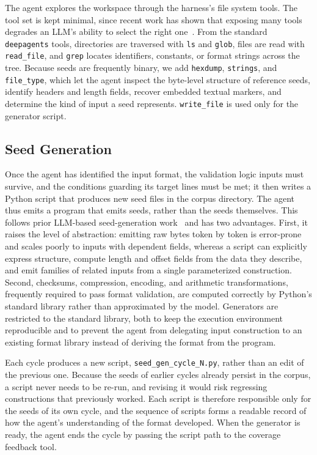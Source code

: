 The agent explores the workspace through the harness's file system tools.
The tool set is kept minimal, since recent work has shown that exposing many tools degrades an \ac{LLM}'s ability to select the right one~\cite{paramanayakamLessMoreOptimizing2025, repantisHowManyTools2026}.
From the standard \texttt{deepagents} tools, directories are traversed with \texttt{ls} and \texttt{glob}, files are read with \texttt{read\_file}, and \texttt{grep} locates identifiers, constants, or format strings across the tree.
Because seeds are frequently binary, we add \texttt{hexdump}, \texttt{strings}, and \texttt{file\_type}, which let the agent inspect the byte-level structure of reference seeds, identify headers and length fields, recover embedded textual markers, and determine the kind of input a seed represents.
\texttt{write\_file} is used only for the generator script.

\subsection{Seed Generation}
\label{sec:agent-generation}

Once the agent has identified the input format, the validation logic inputs must survive, and the conditions guarding its target lines must be met; it then writes a Python script that produces new seed files in the corpus directory.
The agent thus emits a program that emits seeds, rather than the seeds themselves.
This follows prior \ac{LLM}-based seed-generation work~\cite{zhuSeedSmithLLMDrivenSeed2026,xuISC4DGFEnhancingDirected2024,fengFuzzingRandomnessReasoning2025} and has two advantages.
First, it raises the level of abstraction: emitting raw bytes token by token is error-prone and scales poorly to inputs with dependent fields, whereas a script can explicitly express structure, compute length and offset fields from the data they describe, and emit families of related inputs from a single parameterized construction.
Second, checksums, compression, encoding, and arithmetic transformations, frequently required to pass format validation, are computed correctly by Python's standard library rather than approximated by the model.
Generators are restricted to the standard library, both to keep the execution environment reproducible and to prevent the agent from delegating input construction to an existing format library instead of deriving the format from the program.

Each cycle produces a new script, \texttt{seed\_gen\_cycle\_N.py}, rather than an edit of the previous one.
Because the seeds of earlier cycles already persist in the corpus, a script never needs to be re-run, and revising it would risk regressing constructions that previously worked.
Each script is therefore responsible only for the seeds of its own cycle, and the sequence of scripts forms a readable record of how the agent's understanding of the format developed.
When the generator is ready, the agent ends the cycle by passing the script path to the coverage feedback tool.

